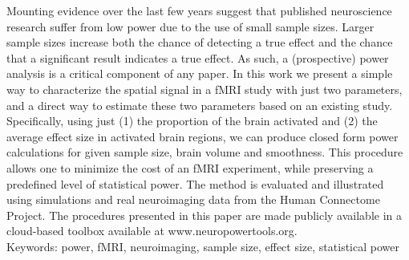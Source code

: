 {\color{Cyan} Mounting evidence over the last few years suggest that published neuroscience research suffer from low power due to the use of small sample sizes.  Larger sample sizes increase both the chance of detecting a true effect and the chance that a significant result indicates a true effect. } As such, a (prospective) power analysis is a critical component of any paper.  In this work we present a simple way to characterize the spatial signal in a fMRI study with just two parameters, and a direct way to estimate these two parameters based on an existing study. Specifically, using just (1) the proportion of the brain activated and (2) the average effect size in activated brain regions, we can produce closed form power calculations for given sample size, brain volume and smoothness. This procedure allows one to minimize the cost of an fMRI experiment, while preserving a predefined level of statistical power.
The method is evaluated and illustrated using simulations and real neuroimaging data from the Human Connectome Project.  The procedures presented in this paper are made publicly available in a cloud-based toolbox available at www.neuropowertools.org.\\

Keywords: power, fMRI, neuroimaging, sample size, effect size, statistical power
